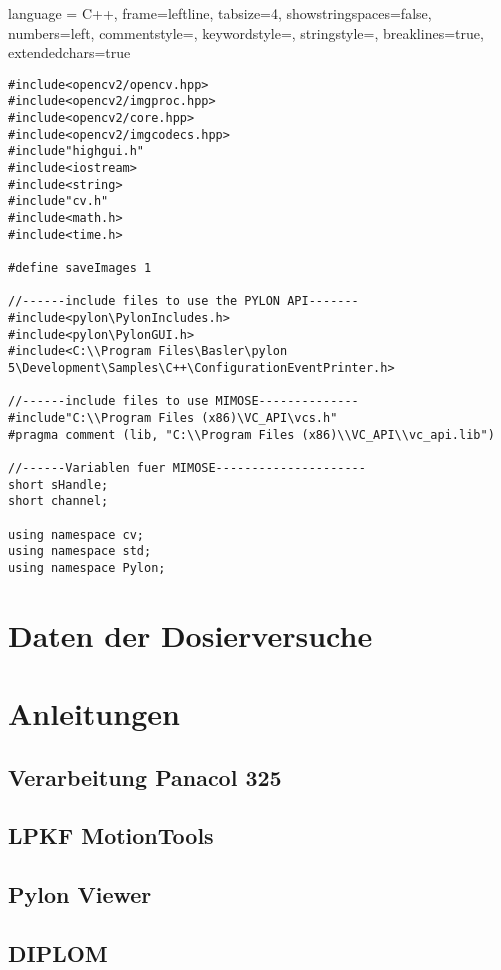 \lstset
{
    language = C++,
    frame=leftline, %
    tabsize=4, %
    showstringspaces=false, %
    numbers=left, %
    commentstyle=\color{gray}, %
    keywordstyle=\color{red}, %
    stringstyle=\color{blue}, %
    breaklines=true,
    extendedchars=true
}
\begin{lstlisting}
#include<opencv2/opencv.hpp>
#include<opencv2/imgproc.hpp>
#include<opencv2/core.hpp>
#include<opencv2/imgcodecs.hpp>
#include"highgui.h"
#include<iostream>
#include<string>
#include"cv.h"
#include<math.h>
#include<time.h>

#define saveImages 1

//------include files to use the PYLON API-------
#include<pylon\PylonIncludes.h>
#include<pylon\PylonGUI.h>
#include<C:\\Program Files\Basler\pylon 5\Development\Samples\C++\ConfigurationEventPrinter.h>

//------include files to use MIMOSE--------------
#include"C:\\Program Files (x86)\VC_API\vcs.h"
#pragma comment (lib, "C:\\Program Files (x86)\\VC_API\\vc_api.lib")

//------Variablen fuer MIMOSE---------------------
short sHandle;
short channel;

using namespace cv;
using namespace std;
using namespace Pylon;
\end{lstlisting}
\clearpage

\section{Daten der Dosierversuche}\label{sec:Dosierversuch}
\clearpage

\section{Anleitungen}\label{sec:anleitungen}
\subsection{Verarbeitung Panacol 325}\label{sec:325}
\clearpage
\subsection{LPKF MotionTools}\label{sec:LPKF}
\clearpage
\subsection{Pylon Viewer}\label{sec:pylon}
\clearpage
\subsection{DIPLOM}\label{sec:diplom}








